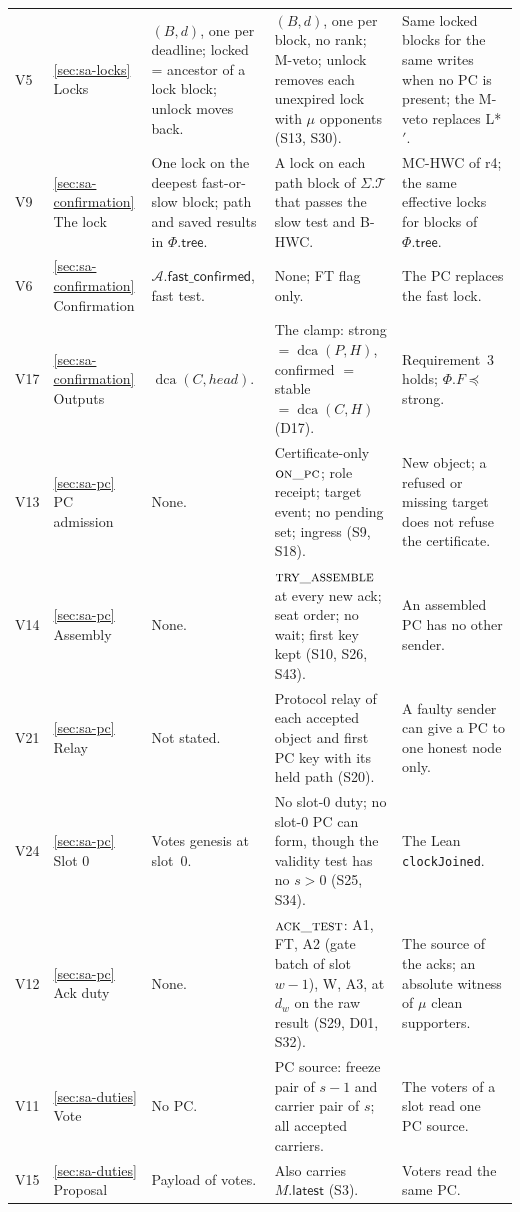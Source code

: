 \documentclass{article}
\newcommand{\T}{\mathcal T}
\newcommand{\AC}{\mathcal A}
\newcommand{\Fr}{\Phi}
\newcommand{\tree}{\mathsf{tree}}
\newcommand{\fastConfirmed}{\mathsf{fast\_confirmed}}
\newcommand{\nm}[1]{\nolinkurl{#1}}
\begin{document}
{\begin{longtable}{@{}p{0.6cm}p{2.1cm}p{3.6cm}p{3.9cm}p{4.3cm}@{}}
V5 & \ref{sec:sa-locks} Locks & $(B,d)$, one per deadline; locked = ancestor of a lock block; unlock moves back. & $(B,d)$, one per block, no rank; M-veto; unlock removes each unexpired lock with $\mu$ opponents (S13, S30). & Same locked blocks for the same writes when no PC is present; the M-veto replaces L*$'$.\\
V9 & \ref{sec:sa-confirmation} The lock & One lock on the deepest fast-or-slow block; path and saved results in $\Fr.\tree$. & A lock on each path block of $\Sigma.\T$ that passes the slow test and B-HWC. & MC-HWC of r4; the same effective locks for blocks of $\Fr.\tree$.\\
V6 & \ref{sec:sa-confirmation} Confirmation & $\AC.\fastConfirmed$, fast test. & None; FT flag only. & The PC replaces the fast lock.\\
V17 & \ref{sec:sa-confirmation} Outputs & $\operatorname{dca}(C,\mathit{head})$. & The clamp: strong $=\operatorname{dca}(P,H)$, confirmed $=$ stable $=\operatorname{dca}(C,H)$ (D17). & Requirement~3 holds; $\Fr.F\preceq$ strong.\\
V13 & \ref{sec:sa-pc} PC admission & None. & Certificate-only $\Call{on\_pc}{}$; role receipt; target event; no pending set; ingress (S9, S18). & New object; a refused or missing target does not refuse the certificate.\\
V14 & \ref{sec:sa-pc} Assembly & None. & $\Call{try\_assemble}{}$ at every new ack; seat order; no wait; first key kept (S10, S26, S43). & An assembled PC has no other sender.\\
V21 & \ref{sec:sa-pc} Relay & Not stated. & Protocol relay of each accepted object and first PC key with its held path (S20). & A faulty sender can give a PC to one honest node only.\\
V24 & \ref{sec:sa-pc} Slot 0 & Votes genesis at slot~0. & No slot-0 duty; no slot-0 PC can form, though the validity test has no $s>0$ (S25, S34). & The Lean \nm{clockJoined}.\\
V12 & \ref{sec:sa-pc} Ack duty & None. & $\Call{ack\_test}{}$: A1, FT, A2 (gate batch of slot $w-1$), W, A3, at $d_w$ on the raw result (S29, D01, S32). & The source of the acks; an absolute witness of $\mu$ clean supporters.\\
V11 & \ref{sec:sa-duties} Vote & No PC. & PC source: freeze pair of $s-1$ and carrier pair of $s$; all accepted carriers. & The voters of a slot read one PC source.\\
V15 & \ref{sec:sa-duties} Proposal & Payload of votes. & Also carries $M.\mathsf{latest}$ (S3). & Voters read the same PC.\\

\end{longtable}}
\end{document}
